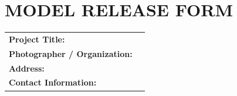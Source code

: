 
\section*{\centering MODEL RELEASE FORM}
\vspace*{0.5cm}

\noindent
\begin{tabular}{p{6cm} p{10cm}}
\textbf{Project Title:} & \ProjectTitle{} \\
\textbf{Photographer / Organization:} & \OrganizationName{} \\ 
\textbf{Address:} & \OrganizationAddress{} \\ 
\textbf{Contact Information:} & \OrganizationContact{}\\ 
\end{tabular}


